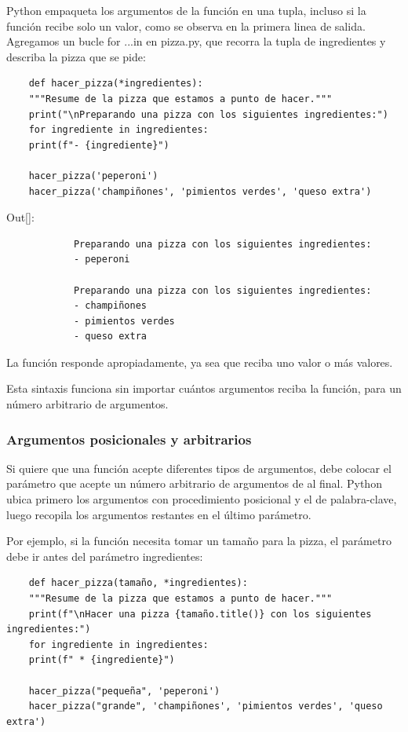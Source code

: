 Python empaqueta los argumentos de la función en una tupla, incluso si la función recibe solo un valor, como se observa en la primera linea de salida.\\


Agregamos un bucle {\ttfamily for ...in} en  {\ttfamily pizza.py},  que recorra la tupla de ingredientes y describa la pizza que se pide:

\hspace{-2.2cm}{\ttfamily \scriptsize pizza.py}\vspace{-0.5cm}
\begin{lstlisting}
	def hacer_pizza(*ingredientes):
	"""Resume de la pizza que estamos a punto de hacer."""
	print("\nPreparando una pizza con los siguientes ingredientes:")
	for ingrediente in ingredientes:
	print(f"- {ingrediente}")
	
	hacer_pizza('peperoni')
	hacer_pizza('champiñones', 'pimientos verdes', 'queso extra')
\end{lstlisting}
{\ttfamily\scriptsize\noindent Out[]:\vspace{-0.3cm}	
	{\color{blue} 	
		\begin{verbatim}
			Preparando una pizza con los siguientes ingredientes:
			- peperoni
			
			Preparando una pizza con los siguientes ingredientes:
			- champiñones
			- pimientos verdes
			- queso extra
		\end{verbatim}
}}

La función responde apropiadamente, ya sea que reciba uno valor o más valores.


Esta sintaxis funciona sin importar cuántos argumentos reciba la función, para un número arbitrario de argumentos.

\subsubsection{Argumentos posicionales y arbitrarios}

Si quiere que una función acepte diferentes tipos de argumentos, debe colocar el parámetro que acepte un número arbitrario de argumentos de al final. Python ubica primero los argumentos con procedimiento posicional y el de palabra-clave,  luego recopila los argumentos restantes en el último parámetro.

Por ejemplo, si la función necesita tomar un tamaño para la pizza, el parámetro debe ir antes del parámetro {\ttfamily*}ingredientes:

\hspace{-2.2cm}{\ttfamily \scriptsize pizza.py}\vspace{-0.5cm}
\begin{lstlisting}
	def hacer_pizza(tamaño, *ingredientes):
	"""Resume de la pizza que estamos a punto de hacer."""
	print(f"\nHacer una pizza {tamaño.title()} con los siguientes ingredientes:")
	for ingrediente in ingredientes:
	print(f" * {ingrediente}")
	
	hacer_pizza("pequeña", 'peperoni')
	hacer_pizza("grande", 'champiñones', 'pimientos verdes', 'queso extra')
\end{lstlisting}

